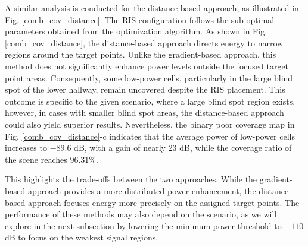 \documentclass{IEEEoj}
\begin{document}
A similar analysis is conducted for the distance-based approach, as illustrated in Fig. \ref{comb_cov_distance}. The RIS configuration follows the sub-optimal parameters obtained from the optimization algorithm. As shown in Fig. \ref{comb_cov_distance}, the distance-based approach directs energy to narrow regions around the target points. Unlike the gradient-based approach, this method does not significantly enhance power levels outside the focused target point areas. Consequently, some low-power cells, particularly in the large blind spot of the lower hallway, remain uncovered despite the RIS placement. This outcome is specific to the given scenario, where a large blind spot region exists, however, in cases with smaller blind spot areas, the distance-based approach could also yield superior results. Nevertheless, the binary poor coverage map in Fig. \ref{comb_cov_distance}-c indicates that the average power of low-power cells increases to $-89.6$ dB, with a gain of nearly $23$ dB, while the coverage ratio of the scene reaches $96.31\%$.

This highlights the trade-offs between the two approaches. While the gradient-based approach provides a more distributed power enhancement, the distance-based approach focuses energy more precisely on the assigned target points. The performance of these methods may also depend on the scenario, as we will explore in the next subsection by lowering the minimum power threshold to $-110$ dB to focus on the weakest signal regions.
\end{document}
